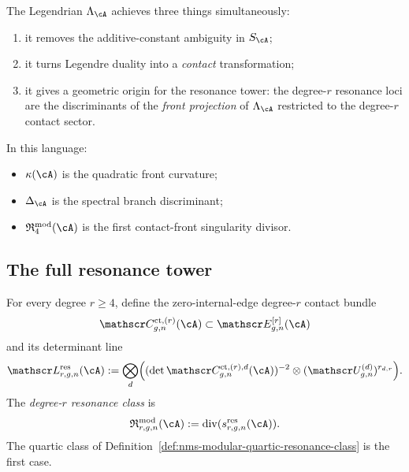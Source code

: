 \begin{remark}
\label{rem:nms-legendrian-three-virtues}
The Legendrian $\Lambda_{\cA}$ achieves three things simultaneously:
\begin{enumerate}[label=\textup{(\roman*)}]
\item it removes the additive-constant ambiguity in $S_{\cA}$;
\item it turns Legendre duality into a \emph{contact} transformation;
\item it gives a geometric origin for the resonance tower: the degree-$r$ resonance loci are the discriminants of the \emph{front projection} of $\Lambda_{\cA}$ restricted to the degree-$r$ contact sector.
\end{enumerate}
In this language:
\begin{itemize}
\item $\kappa(\cA)$ is the quadratic front curvature;
\item $\Delta_{\cA}$ is the spectral branch discriminant;
\item $\mathfrak R^{\mathrm{mod}}_4(\cA)$ is the first contact-front singularity divisor.
\end{itemize}
\end{remark}

\subsection{The full resonance tower}
\label{subsec:nms-full-resonance-tower}

\begin{definition}
\label{def:nms-degree-r-resonance-class}
For every degree $r\ge 4$, define the zero-internal-edge degree-$r$ contact bundle
\[
\mathscr C^{\mathrm{ct},(r)}_{g,n}(\cA)
\subset \mathscr E^{[r]}_{g,n}(\cA)
\]
and its determinant line
\[
\mathscr L^{\mathrm{res}}_{r,g,n}(\cA)
:=\bigotimes_d
\Bigl((\det \mathscr C^{\mathrm{ct},(r),d}_{g,n}(\cA))^{-2}
\otimes (\mathscr U^{(d)}_{g,n})^{r_{d,r}}\Bigr).
\]
The \emph{degree-$r$ resonance class} is
\[
\mathfrak R^{\mathrm{mod}}_{r,g,n}(\cA)
:=\operatorname{div}(s^{\mathrm{res}}_{r,g,n}(\cA)).
\]
The quartic class of Definition~\ref{def:nms-modular-quartic-resonance-class} is the first case.
\end{definition}

